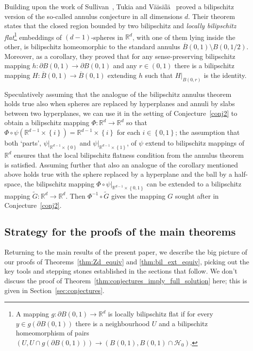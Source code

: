 \documentclass[a4paper, bibliography=totoc]{scrartcl}
\numberwithin{claimcounter}{define}
\newcommand{\R}{\mathbb{R}}
\newcommand{\rest}[2]{#1|_{#2}} %
\newcommand{\mc}[1]{\mathcal{#1}}
\newcommand{\set}[1]{\left\{#1\right\}}
\newcommand{\br}[1]{\left(#1\right)}
\newcommand{\wt}[1]{\widetilde{#1}}
\newcommand{\cl}[1]{\overline{#1}}
\begin{document}
Building upon the work of Sullivan~\cite{Sullivan}, Tukia and V\"ais\"al\"a~\cite[Thm.~3.12]{Tukia_Vaisala-approx_and_extend} proved a bilipschitz version of the so-called annulus conjecture in all dimensions $d$. Their theorem states that the closed region bounded by two bilipschitz and \emph{locally bilipschitz flat}\footnote{A mapping $g\colon \partial B(0, 1)\to\R^d$ is locally bilipschitz flat if for every $y\in g(\partial B(0,1))$ there is a neighbourhood $U$ and a bilipschitz homeomorphism of pairs $\br{U, U\cap g(\partial B(0,1))}\to \br{B(0, 1), B(0,1)\cap \mc{H}_0}$.} embeddings of $(d-1)$-spheres in $\R^{d}$, with one of them lying inside the other, is bilipschitz homeomorphic to the standard annulus $\cl{B}(0,1)\setminus B(0,1/2)$. Moreover, as a corollary, they proved \cite[Thm.~3.14]{Tukia--Vaisala-Quasiconformal_implies_bilip} that for any sense-preserving bilipschitz mapping $h\colon\partial B(0,1)\to\partial B(0,1)$ and any $r\in(0,1)$ there is a bilipschitz mapping $H\colon \cl{B}(0,1)\to \cl{B}(0,1)$ extending $h$ such that $\rest{H}{B(0, r)}$ is the identity.

Speculatively assuming that the analogue of the bilipschitz annulus theorem holds true also when spheres are replaced by hyperplanes and annuli by slabs between two hyperplanes, we can use it in the setting of Conjecture~\ref{conj2} to obtain a bilipschitz mapping $\Phi\colon\R^d\to\R^d$ so that $\Phi\circ \psi(\R^{d-1}\times\set{i})=\R^{d-1}\times\set{i}$ for each $i\in\set{0,1}$; the  assumption that both `parts', $\psi|_{\R^{d-1}\times\set{0}}$ and $\psi|_{\R^{d-1}\times\set{1}}$, of $\psi$ extend to bilipschitz mappings of $\R^{d}$ ensures that the local bilipschitz flatness condition from the annulus theorem is satisfied.
Assuming further that also an analogue of the corollary \cite[Thm.~3.14]{Tukia--Vaisala-Quasiconformal_implies_bilip} mentioned above holds true with the sphere replaced by a hyperplane and the ball by a half-space, the bilipschitz mapping $\Phi\circ \psi|_{\R^{d-1}\times\set{0,1}}$ can be extended to a bilipschitz mapping $\wt{G}\colon\R^d\to\R^d$. Then $\Phi^{-1}\circ\wt{G}$ gives the mapping $G$ sought after in Conjecture~\ref{conj2}.





\subsection*{Strategy for the proofs of the main theorems}
Returning to the main results of the present paper, we describe the big picture of our proofs of Theorems~\ref{thm:Zd_equiv} and \ref{thm:bil_ext_equiv}, picking out the key tools and stepping stones established in the sections that follow. We don't discuss the proof of Theorem~\ref{thm:conjectures_imply_full_solution} here; this is given in Section~\ref{sec:conjectures}.
\end{document}
